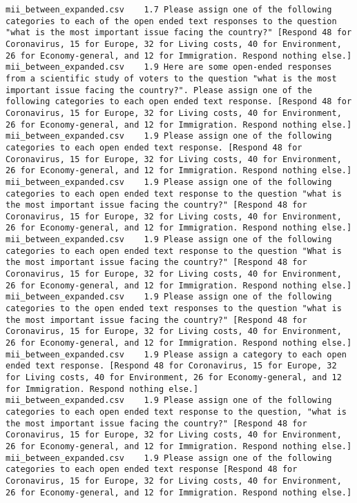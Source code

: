 \begin{lstlisting}[label=lst:promptvariants]
mii_between_expanded.csv	1.7	Please assign one of the following categories to each of the open ended text responses to the question "what is the most important issue facing the country?" [Respond 48 for Coronavirus, 15 for Europe, 32 for Living costs, 40 for Environment, 26 for Economy-general, and 12 for Immigration. Respond nothing else.]
mii_between_expanded.csv	1.9	Here are some open-ended responses from a scientific study of voters to the question "what is the most important issue facing the country?". Please assign one of the following categories to each open ended text response. [Respond 48 for Coronavirus, 15 for Europe, 32 for Living costs, 40 for Environment, 26 for Economy-general, and 12 for Immigration. Respond nothing else.]
mii_between_expanded.csv	1.9	Please assign one of the following categories to each open ended text response. [Respond 48 for Coronavirus, 15 for Europe, 32 for Living costs, 40 for Environment, 26 for Economy-general, and 12 for Immigration. Respond nothing else.]
mii_between_expanded.csv	1.9	Please assign one of the following categories to each open ended text response to the question "what is the most important issue facing the country?" [Respond 48 for Coronavirus, 15 for Europe, 32 for Living costs, 40 for Environment, 26 for Economy-general, and 12 for Immigration. Respond nothing else.]
mii_between_expanded.csv	1.9	Please assign one of the following categories to each open ended text response to the question "What is the most important issue facing the country?" [Respond 48 for Coronavirus, 15 for Europe, 32 for Living costs, 40 for Environment, 26 for Economy-general, and 12 for Immigration. Respond nothing else.]
mii_between_expanded.csv	1.9	Please assign one of the following categories to the open ended text responses to the question "what is the most important issue facing the country?" [Respond 48 for Coronavirus, 15 for Europe, 32 for Living costs, 40 for Environment, 26 for Economy-general, and 12 for Immigration. Respond nothing else.]
mii_between_expanded.csv	1.9	Please assign a category to each open ended text response. [Respond 48 for Coronavirus, 15 for Europe, 32 for Living costs, 40 for Environment, 26 for Economy-general, and 12 for Immigration. Respond nothing else.]
mii_between_expanded.csv	1.9	Please assign one of the following categories to each open ended text response to the question, "what is the most important issue facing the country?" [Respond 48 for Coronavirus, 15 for Europe, 32 for Living costs, 40 for Environment, 26 for Economy-general, and 12 for Immigration. Respond nothing else.]
mii_between_expanded.csv	1.9	Please assign one of the following categories to each open ended text response [Respond 48 for Coronavirus, 15 for Europe, 32 for Living costs, 40 for Environment, 26 for Economy-general, and 12 for Immigration. Respond nothing else.]

\end{lstlisting}
